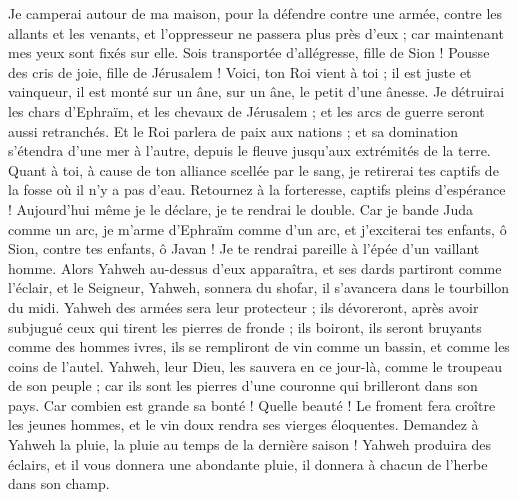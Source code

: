\begin{multicols}{2}
Je camperai autour de ma maison, pour la défendre contre une armée, contre les allants et les venants, et l’oppresseur ne passera plus près d’eux ; car maintenant mes yeux sont fixés sur elle.
Sois transportée d’allégresse, fille de Sion ! Pousse des cris de joie, fille de Jérusalem ! Voici, ton Roi vient à toi ; il est juste et vainqueur, il est monté sur un âne, sur un âne, le petit d'une ânesse.
Je détruirai les chars d'Ephraïm, et les chevaux de Jérusalem ; et les arcs de guerre seront aussi retranchés.  Et le Roi parlera de paix aux nations ; et sa domination s'étendra d’une mer à l’autre, depuis le fleuve jusqu'aux extrémités de la terre.
Quant à toi, à cause de ton alliance scellée par le sang, je retirerai tes captifs de la fosse où il n'y a pas d'eau.
Retournez à la forteresse, captifs pleins d’espérance ! Aujourd'hui même je le déclare, je te rendrai le double.
Car je bande Juda comme un arc, je m’arme d’Ephraïm comme d’un arc, et j’exciterai tes enfants, ô Sion, contre tes enfants, ô Javan ! Je te rendrai pareille à l’épée d’un vaillant homme.
Alors Yahweh au-dessus d’eux apparaîtra, et ses dards partiront comme l'éclair, et le Seigneur, Yahweh, sonnera du shofar, il s’avancera dans le tourbillon du midi.
Yahweh des armées sera leur protecteur ; ils dévoreront, après avoir subjugué ceux qui tirent les pierres de fronde ; ils boiront, ils seront bruyants comme des hommes ivres, ils se rempliront de vin comme un bassin, et comme les coins de l'autel.
Yahweh, leur Dieu, les sauvera en ce jour-là, comme le troupeau de son peuple ; car ils sont les pierres d’une couronne  qui brilleront dans son pays.
Car combien est grande sa bonté ! Quelle beauté ! Le froment fera croître les jeunes hommes, et le vin doux rendra ses vierges éloquentes.
\VerseOne{}Demandez à Yahweh la pluie, la pluie au temps de la dernière saison ! Yahweh produira des éclairs, et il vous donnera une abondante pluie, il donnera à chacun de l'herbe dans son champ.

\end{multicols}
